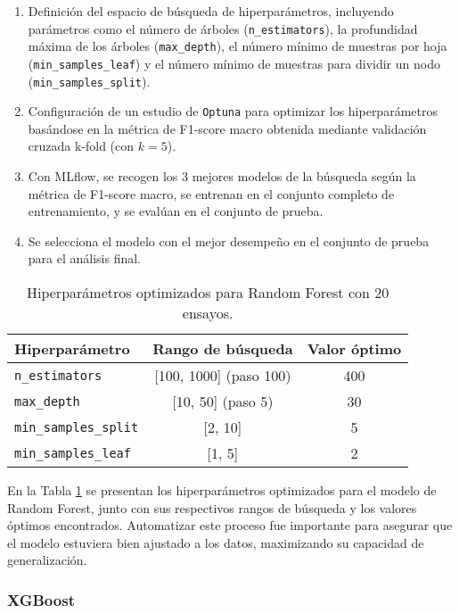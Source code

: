 \documentclass[paper=letter, fontsize=11pt, draft=false]{scrartcl}
\numberwithin{equation}{problemcounter} %
\numberwithin{figure}{problemcounter} %
\numberwithin{table}{problemcounter} %
\numberwithin{subsection}{problemcounter}
\begin{document}
\begin{enumerate}
    \item Definición del espacio de búsqueda de hiperparámetros, incluyendo parámetros como el número de árboles (\texttt{n\_estimators}), la profundidad máxima de los árboles (\texttt{max\_depth}), el número mínimo de muestras por hoja (\texttt{min\_samples\_leaf}) y el número mínimo de muestras para dividir un nodo (\texttt{min\_samples\_split}).
    \item Configuración de un estudio de \texttt{Optuna} para optimizar los hiperparámetros basándose en la métrica de F1-score macro obtenida mediante validación cruzada k-fold (con $k=5$).
    \item Con MLflow, se recogen los 3 mejores modelos de la búsqueda según la métrica de F1-score macro, se entrenan en el conjunto completo de entrenamiento, y se evalúan en el conjunto de prueba.
    \item Se selecciona el modelo con el mejor desempeño en el conjunto de prueba para el análisis final.
\end{enumerate}


\begin{table}[H]
\centering
\caption{Hiperparámetros optimizados para Random Forest con 20 ensayos.}
\label{tab:rf_hyperparams}
\begin{tabular}{lcc}
\toprule
\textbf{Hiperparámetro} & \textbf{Rango de búsqueda} & \textbf{Valor óptimo} \\
\midrule
\texttt{n\_estimators} & [100, 1000] (paso 100) & 400 \\
\texttt{max\_depth} & [10, 50] (paso 5) & 30 \\
\texttt{min\_samples\_split} & [2, 10] & 5 \\
\texttt{min\_samples\_leaf} & [1, 5] & 2 \\
\bottomrule
\end{tabular}
\end{table}

En la Tabla \ref{tab:rf_hyperparams} se presentan los hiperparámetros optimizados para el modelo de Random Forest, junto con sus respectivos rangos de búsqueda y los valores óptimos encontrados. Automatizar este proceso fue importante para asegurar que el modelo estuviera bien ajustado a los datos, maximizando su capacidad de generalización.


\subsubsection{XGBoost}
\end{document}
